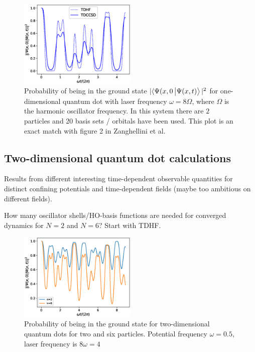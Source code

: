 \documentclass[aip,jcp,reprint,floatfix]{revtex4-1}
\begin{document}
        \begin{figure}
        \includegraphics[width=0.5\textwidth]{./figures/zanghellini_fig2.eps}
        \caption{\label{fig:1DZanghellini} Probability of being in the ground state
        $|\langle\Psi(x,0\ket{\Psi(x,t)}|^2$ for one-dimensional quantum dot with laser frequency
        $\omega = 8\Omega$, where $\Omega$ is the harmonic oscillator frequency. In this system there are $2$ particles and
        20 basis sets / orbitals have been used. This plot is an exact match with figure 2 in Zanghellini
        et al.\cite{Zanghellini04}
        }
        \end{figure}

    \subsection{Two-dimensional quantum dot calculations}
        Results from different interesting time-dependent observable quantities for distinct confining potentials and time-dependent fields (maybe too ambitious on different fields).
        
        How many oscillator shells/HO-basis functions are needed for converged dynamics for $N=2$ and $N=6$? Start with TDHF. 
        
        \begin{figure}
            \centering
            \includegraphics[width=0.5\textwidth]{./figures/2Domega05.eps}
            \caption{Probability of being in the ground state for two-dimensional
            quantum dots for two and six particles. 
            Potential frequency $\omega=0.5$, laser frequency is $8\omega = 4$}
            \label{fig:2Doemga05}
        \end{figure}
        
\end{document}

